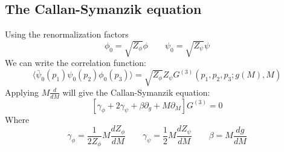 \documentclass{article}
\begin{document}
\subsection{The Callan-Symanzik equation}
Using the renormalization factors
\begin{equation}
    \phi_0 = \sqrt{Z_\phi}\phi
    \qquad
    \psi_0 = \sqrt{Z_\psi}\psi
\end{equation}
We can write the correlation function:
\begin{equation}
    \langle \bar{\psi}_0(p_1)\psi_0(p_2)\phi_0(p_3) \rangle = \sqrt{Z_\phi}Z_\psi G^{(3)}(p_1, p_2, p_3; g(M), M)
\end{equation}
Applying $M \frac{d}{dM}$ will give the Callan-Symanzik equation:
\begin{equation}
    \left[
        \gamma_\phi + 2\gamma_\psi +
        \beta\partial_g + M\partial_M
    \right]G^{(3)} = 0
\end{equation}
Where
\begin{equation}
    \gamma_\phi = \frac{1}{2Z_\phi}M\frac{dZ_\phi}{dM}
    \qquad
    \gamma_\psi = \frac{1}{2}M\frac{dZ_\psi}{dM}
    \qquad
    \beta = M \frac{dg}{dM}
\end{equation}
\end{document}
